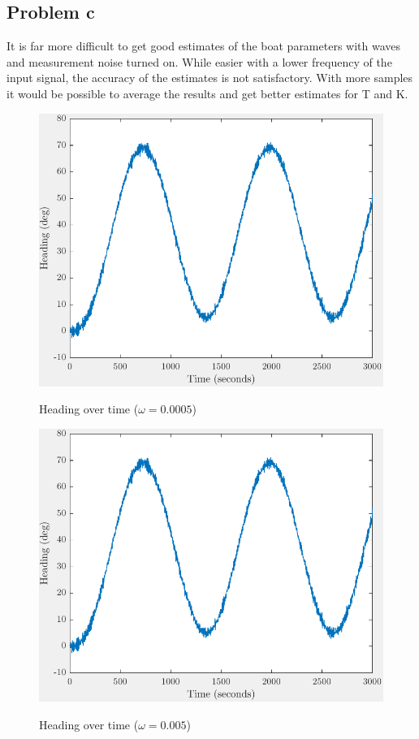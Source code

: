 \subsection{Problem c}
It is far more difficult to get good estimates of the boat parameters with waves and measurement noise
turned on. While easier with a lower frequency of the input signal, the accuracy of the estimates is not
satisfactory. With more samples it would be possible to average the results and get better estimates for
T and K. 

\begin{figure}[h]
    \centering
    \begin{minipage}[b]{0.48\textwidth}
        \includegraphics[width=\textwidth]{"images/1c-omega_lik_0005"}
        \label{fig:1c-omega=0.0005}
        \caption{Heading over time ($\omega = 0.0005$)}
    \end{minipage}
    \hfill
    \begin{minipage}[b]{0.48\textwidth}
        \includegraphics[width=\textwidth]{"images/1c-omega_lik_005"}
        \label{fig:1c-omega=0.005}
        \caption{Heading over time ($\omega = 0.005$)}
    \end{minipage}
\end{figure}

